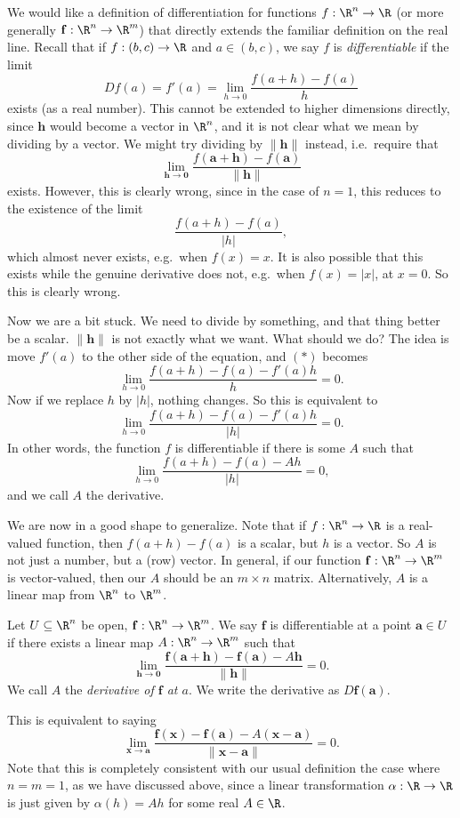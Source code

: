 \documentclass[a4paper]{article}
\begin{document}
We would like a definition of differentiation for functions $f: \R^n \to \R$ (or more generally $\mathbf{f}: \R^n \to \R^m$) that directly extends the familiar definition on the real line. Recall that if $f: (b, c) \to \R$ and $a \in (b, c)$, we say $f$ is \emph{differentiable} if the limit
\[
  Df(a) = f'(a) = \lim_{h \to 0} \frac{f(a + h) - f(a)}{h}\tag{$*$}
\]
exists (as a real number). This cannot be extended to higher dimensions directly, since $\mathbf{h}$ would become a vector in $\R^n$, and it is not clear what we mean by dividing by a vector. We might try dividing by $\|\mathbf{h}\|$ instead, i.e.\ require that
\[
  \lim_{\mathbf{h}\to \mathbf{0}}\frac{f(\mathbf{a} + \mathbf{h}) - f(\mathbf{a})}{\|\mathbf{h}\|}
\]
exists. However, this is clearly wrong, since in the case of $n = 1$, this reduces to the existence of the limit
\[
  \frac{f(a + h) - f(a)}{|h|},
\]
which almost never exists, e.g.\ when $f(x) = x$. It is also possible that this exists while the genuine derivative does not, e.g.\ when $f(x) = |x|$, at $x = 0$. So this is clearly wrong.

Now we are a bit stuck. We need to divide by something, and that thing better be a scalar. $\|\mathbf{h}\|$ is not exactly what we want. What should we do? The idea is move $f'(a)$ to the other side of the equation, and $(*)$ becomes
\[
  \lim_{h \to 0} \frac{f(a + h) - f(a) - f'(a) h}{h} = 0.
\]
Now if we replace $h$ by $|h|$, nothing changes. So this is equivalent to
\[
  \lim_{h \to 0} \frac{f(a + h) - f(a) - f'(a) h}{|h|} = 0.
\]
In other words, the function $f$ is differentiable if there is some $A$ such that
\[
  \lim_{h \to 0} \frac{f(a + h) - f(a) - A h}{|h|} = 0,
\]
and we call $A$ the derivative.

We are now in a good shape to generalize. Note that if $f: \R^n \to \R$ is a real-valued function, then $f(a + h) - f(a)$ is a scalar, but $h$ is a vector. So $A$ is not just a number, but a (row) vector. In general, if our function $\mathbf{f}: \R^n \to \R^m$ is vector-valued, then our $A$ should be an $m \times n$ matrix. Alternatively, $A$ is a linear map from $\R^n$ to $\R^m$.

\begin{defi}[Differentiation in $\R^n$]
  Let $U\subseteq \R^n$ be open, $\mathbf{f}: \R^n \to \R^m$. We say $\mathbf{f}$ is differentiable at a point $\mathbf{a} \in U$ if there exists a linear map $A: \R^n \to \R^m$ such that
  \[
    \lim_{\mathbf{h} \to \mathbf{0}} \frac{\mathbf{f}(\mathbf{a} + \mathbf{h}) - \mathbf{f}(\mathbf{a}) - A \mathbf{h}}{\|\mathbf{h}\|} = 0.
  \]
  We call $A$ the \emph{derivative of $\mathbf{f}$ at $a$}. We write the derivative as $D \mathbf{f}(\mathbf{a})$.
\end{defi}
This is equivalent to saying
\[
  \lim_{\mathbf{x} \to \mathbf{a}} \frac{\mathbf{f}(\mathbf{x}) - \mathbf{f}(\mathbf{a}) - A (\mathbf{x} - \mathbf{a})}{\|\mathbf{x} - \mathbf{a}\|} = 0.
\]
Note that this is completely consistent with our usual definition the case where $n = m = 1$, as we have discussed above, since a linear transformation $\alpha: \R \to \R$ is just given by $\alpha(h) = Ah$ for some real $A \in \R$.
\end{document}

